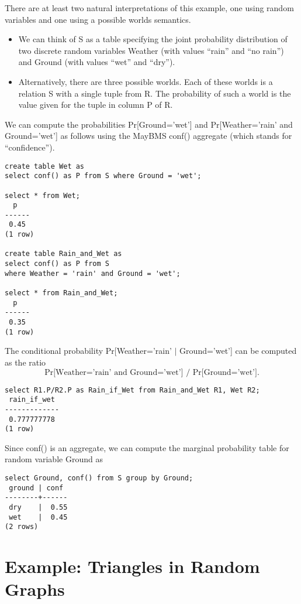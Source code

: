 There are at least two natural interpretations of this example,
one using random variables and one using a possible worlds semantics.
%
\begin{itemize}
\item
We can think of S as a table specifying the joint probability distribution
of two discrete random variables Weather (with values ``rain'' and ``no rain'')
and Ground (with values ``wet'' and ``dry'').

\item
Alternatively, there are three possible worlds. Each of these worlds
is a relation S with a single tuple from R. The probability of such a world is
the value given for the tuple in column P of R.
\end{itemize}

We can compute the probabilities Pr[Ground='wet'] and
Pr[Weather='rain' and Ground='wet'] as follows
using the MayBMS conf() aggregate (which stands for ``confidence'').
%
\begin{verbatim}
create table Wet as
select conf() as P from S where Ground = 'wet';

select * from Wet;
  p
------
 0.45
(1 row)

create table Rain_and_Wet as
select conf() as P from S
where Weather = 'rain' and Ground = 'wet';

select * from Rain_and_Wet;
  p
------
 0.35
(1 row)
\end{verbatim}

The conditional probability
Pr[Weather='rain' $|$ Ground='wet'] can be computed as the ratio
\[
\mbox{Pr[Weather='rain' and Ground='wet'] / Pr[Ground='wet'].}
\]
%
\begin{verbatim}
select R1.P/R2.P as Rain_if_Wet from Rain_and_Wet R1, Wet R2;
 rain_if_wet
-------------
 0.777777778
(1 row)
\end{verbatim}

Since conf() is an aggregate, we can compute the marginal probability
table for random variable Ground as
\begin{verbatim}
select Ground, conf() from S group by Ground;
 ground | conf
--------+------
 dry    |  0.55
 wet    |  0.45
(2 rows)
\end{verbatim}


\section{Example: Triangles in Random Graphs}
\label{sec:randgraph}

